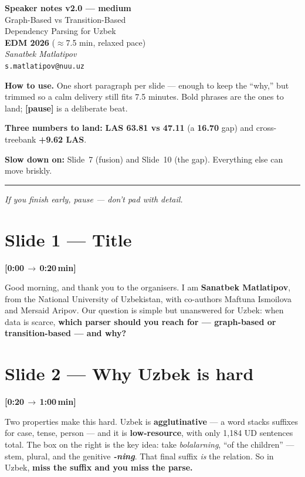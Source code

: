 \documentclass[12pt,a4paper]{article}
\newcommand{\timing}[2]{%
   \par\noindent\textbf{\small [#1\,$\to$\,#2\,min]}\par\vspace{0.15em}}
\newcommand{\say}[1]{\textbf{#1}}
\begin{document}
\begin{center}
   {\LARGE\bfseries Speaker notes v2.0 --- medium}\\[0.5em]
   {\large Graph-Based vs Transition-Based\\Dependency Parsing for Uzbek}\\[0.4em]
   {\normalsize \textbf{EDM 2026} \quad ($\approx$7.5 min, relaxed pace)}\\[1em]
   \textit{Sanatbek Matlatipov}\\
   \texttt{s.matlatipov@nuu.uz}
\end{center}

\vspace{0.8em}
\noindent\textbf{How to use.} One short paragraph per slide --- enough to
keep the ``why,'' but trimmed so a calm delivery still fits 7.5 minutes.
Bold phrases are the ones to land; \textbf{[pause]} is a deliberate beat.

\vspace{0.4em}
\noindent\textbf{Three numbers to land:} \textbf{LAS 63.81 vs 47.11}
(a \textbf{16.70} gap) and cross-treebank \textbf{+9.62 LAS}.

\vspace{0.4em}
\noindent\textbf{Slow down on:} Slide~7 (fusion) and Slide~10 (the gap).
Everything else can move briskly.

\vfill\hrule\vspace{0.4em}
\noindent\textit{If you finish early, pause --- don't pad with detail.}

\newpage

\section*{Slide 1 --- Title}
\timing{0:00}{0:20}
Good morning, and thank you to the organisers. I am \say{Sanatbek
Matlatipov}, from the National University of Uzbekistan, with co-authors
Maftuna Ismoilova and Mersaid Aripov. Our question is simple but
unanswered for Uzbek: when data is scarce, \say{which parser should you
reach for --- graph-based or transition-based --- and why?}

\section*{Slide 2 --- Why Uzbek is hard}
\timing{0:20}{1:00}
Two properties make this hard. Uzbek is \say{agglutinative} --- a word
stacks suffixes for case, tense, person --- and it is \say{low-resource},
with only 1,184 UD sentences total. The box on the right is the key idea:
take \textit{bolalarning}, ``of the children'' --- stem, plural, and the
genitive \textbf{\textit{-ning}}. That final suffix \emph{is} the
relation. So in Uzbek, \say{miss the suffix and you miss the parse.}
\end{document}
